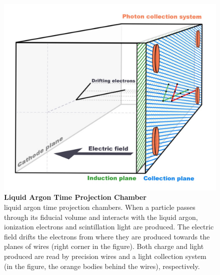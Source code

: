 \begin{figure}[h!]
	\begin{center}
		\includegraphics[scale=0.12]{Figures/LARTPC.jpg}
		\caption[LArTPC]{ {\textbf{Liquid Argon Time Projection Chamber}} \\ liquid argon time projection chambers. When a particle passes through its fiducial volume and interacts with the liquid argon, ionization electrons and scintillation light are produced. The electric field drifts the electrons from where they are produced towards the planes of wires (right corner in the figure). Both charge and light produced are read by precision wires and a light collection system (in the figure, the orange bodies behind the wires), respectively.}
		\label{lartpc}	
	\end{center}
\end{figure}
%
